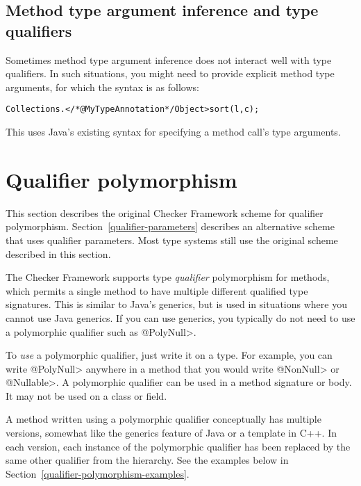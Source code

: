\subsection{Method type argument inference and type qualifiers\label{infer-method-type-qualifiers}}

Sometimes method type argument inference does not interact well with
type qualifiers. In such situations, you might need to provide
explicit method type arguments, for which the syntax is as follows:

\begin{alltt}
    Collections.</*@MyTypeAnnotation*/ Object>sort(l, c);
\end{alltt}

\noindent
This uses Java's existing syntax for specifying a method call's type arguments.



\section{Qualifier polymorphism\label{qualifier-polymorphism}}

This section describes the original Checker Framework scheme for qualifier
polymorphism.  Section~\ref{qualifier-parameters} describes an alternative
scheme that uses qualifier parameters.
Most type systems still use the original scheme described in this section.

The Checker Framework supports type \emph{qualifier} polymorphism for
methods, which permits a single method to have multiple different qualified
type signatures.  This is similar to Java's generics, but is used in
situations where you cannot use Java generics.  If you can use generics,
you typically do not need to use a polymorphic qualifier such as \<@PolyNull>.

To \emph{use} a polymorphic qualifier, just write it on a type.
For example, you can write \<@PolyNull> anywhere in a method that you would write
\<@NonNull> or \<@Nullable>.
A polymorphic qualifier can be used in a method signature or body.
It may not be used on a class or field.

A method written using a polymorphic qualifier conceptually has multiple
versions, somewhat like the generics feature of Java or a template in C++.
In each version, each instance of the polymorphic qualifier has been
replaced by the same other qualifier from the hierarchy.  See the examples
below in Section~\ref{qualifier-polymorphism-examples}.

